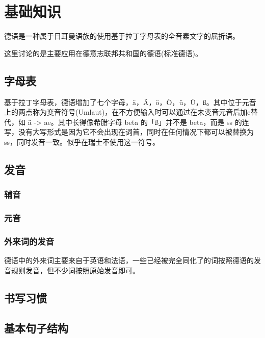 \section{基础知识}

德语是一种属于日耳曼语族的使用基于拉丁字母表的全音素文字的屈折语。

这里讨论的是主要应用在德意志联邦共和国的德语(标准德语)。

\subsection{字母表}

基于拉丁字母表，德语增加了七个字母，ä，Ä，ö，Ö，ü，Ü，ß。其中位于元音上的两点称为变音符号(Umlaut)，在不方便输入时可以通过在未变音元音后加e替代，如 ä -> ae。其中长得像希腊字母 beta 的「ß」并不是 beta，而是 ss 的连写，没有大写形式是因为它不会出现在词首，同时在任何情况下都可以被替换为 ss，同时发音一致。似乎在瑞士不使用这一符号。


\subsection{发音}


\subsubsection{辅音}
\subsubsection{元音}
\subsubsection{外来词的发音}
德语中的外来词主要来自于英语和法语，一些已经被完全同化了的词按照德语的发音规则发音，但不少词按照原始发音即可。
\subsection{书写习惯}

\subsection{基本句子结构}
